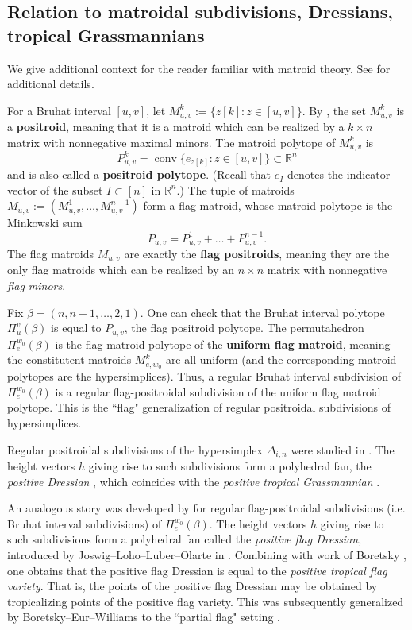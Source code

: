 \documentclass[11pt]{amsart}
\theoremstyle{definition}
\newcommand{\RR}{\mathbb{R}}
\newcommand\defn[1]{{\bf #1}}
\def\pt{\beta}
\DeclareMathOperator{\conv}{conv}
\begin{document}
\subsection{Relation to matroidal subdivisions, Dressians, tropical Grassmannians}\label{ssec:rel-to-matroid-polytopes} 

We give additional context for the reader familiar with matroid theory. See \cite{BEW24} for additional details. 

For a Bruhat interval $[u,v]$, let $M_{u,v}^k:=\{z[k]: z \in [u,v]\}$. By \cite{KW15}, the set $M_{u,v}^k$ is a \textbf{positroid}, meaning that it is a matroid which can be realized by a $k \times n$ matrix with nonnegative maximal minors. The matroid polytope of $M_{u,v}^k$ is 
\[P_{u,v}^k=\conv\{e_{z[k]} : z \in [u,v]\} \subset \RR^n\]
and is also called a \textbf{positroid polytope}. (Recall that $e_I$ denotes the indicator vector of the subset $I \subset [n]$ in $\RR^n$.) The tuple of matroids $M_{u,v}:=(M_{u,v}^1, \dots, M_{u,v}^{n-1})$ form a flag matroid, whose matroid polytope is the Minkowski sum
\[P_{u,v}=P_{u,v}^1 + \dots + P_{u,v}^{n-1}.\]
The flag matroids $M_{u,v}$ are exactly the \textbf{flag positroids}, meaning they are the only flag matroids which can be realized by an $n \times n$ matrix with nonnegative \emph{flag minors}.

Fix $\pt=(n, n-1, \dots, 2,1)$. One can check that the Bruhat interval polytope $\Pi_u^v(\pt)$ is equal to $P_{u,v}$, the flag positroid polytope. The permutahedron $\Pi_e^{w_0}(\pt)$ is the flag matroid polytope of the \defn{uniform flag matroid}, meaning the constitutent matroids $M_{e, w_0}^k$ are all uniform (and the corresponding matroid polytopes are the hypersimplices). Thus, a regular Bruhat interval subdivision of $\Pi_e^{w_0}(\pt)$ is a regular flag-positroidal subdivision of the uniform flag matroid polytope. This is the ``flag" generalization of regular positroidal subdivisions of hypersimplices. 

Regular positroidal subdivisions of the hypersimplex $\Delta_{i,n}$ were studied in \cite{SW21,LPW,AHLS}. The height vectors $h$ giving rise to such subdivisions form a polyhedral fan, the \emph{positive Dressian} \cite{LPW}, which coincides with the \emph{positive tropical Grassmannian} \cite{SW21,AHLS}. 

An analogous story was developed by \cite{JLLO23,B23} for regular flag-positroidal subdivisions (i.e. Bruhat interval subdivisions) of $\Pi_e^{w_0}(\pt)$. The height vectors $h$ giving rise to such subdivisions form a polyhedral fan called the \emph{positive flag Dressian}, introduced by Joswig--Loho--Luber--Olarte in \cite{JLLO23}. Combining \cite{JLLO23} with work of Boretsky \cite{B23}, one obtains that the positive flag Dressian is equal to the \emph{positive tropical flag variety}. That is, the points of the positive flag Dressian may be obtained by tropicalizing points of the positive flag variety. This was subsequently generalized by Boretsky--Eur--Williams to the ``partial flag" setting \cite{BEW24}.
\end{document}
